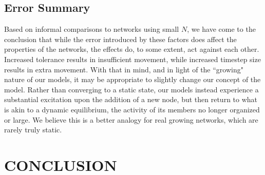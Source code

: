 \documentclass[aps,pre,reprint,superscriptaddress,amsmath,amssymb,nofootinbib]{revtex4-1}
\begin{document}
\subsection{Error Summary}
Based on informal comparisons to networks using small $N$, we have come to the conclusion that while the error introduced by these factors does affect the properties of the networks, the effects do, to some extent, act against each other.  Increased tolerance results in insufficient movement, while increased timestep size results in extra movement.  With that in mind, and in light of the ``growing" nature of our models, it may be appropriate to slightly change our concept of the model.  Rather than converging to a static state, our models instead experience a substantial excitation upon the addition of a new node, but then return to what is akin to a dynamic equilibrium, the activity of its members no longer organized or large.  We believe this is a better analogy for real growing networks, which are rarely truly static.

\section{CONCLUSION}


\end{document}
